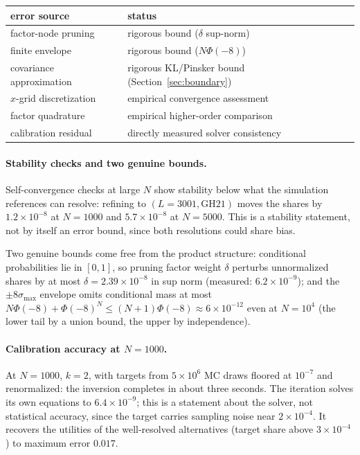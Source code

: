 \documentclass[12pt]{article}
\theoremstyle{remark}
\begin{document}
\begin{center}
\footnotesize
\begin{tabular}{lp{6.2cm}}
\toprule
error source & status \\
\midrule
factor-node pruning & rigorous bound ($\delta$ sup-norm) \\
finite envelope & rigorous bound ($N\Phi(-8)$) \\
covariance approximation & rigorous KL/Pinsker bound (Section~\ref{sec:boundary}) \\
$x$-grid discretization & empirical convergence assessment \\
factor quadrature & empirical higher-order comparison \\
calibration residual & directly measured solver consistency \\
\bottomrule
\end{tabular}
\end{center}

\paragraph{Stability checks and two genuine bounds.} Self-convergence
checks at large $N$ show stability below what the
simulation references can resolve: refining to $(L = 3001, \mathrm{GH}21)$
moves the shares by $1.2\times10^{-8}$ at $N=1000$ and
$5.7\times10^{-8}$ at $N=5000$. This is a stability statement, not by
itself an error bound, since both resolutions could share bias.

Two genuine bounds
come free from the product structure: conditional probabilities lie in
$[0,1]$, so pruning factor weight $\delta$ perturbs unnormalized shares by
at most $\delta = 2.39\times10^{-8}$ in sup norm (measured:
$6.2\times10^{-9}$); and the $\pm8\sigma_{\max}$ envelope omits
conditional mass at most $N\Phi(-8) + \Phi(-8)^N \le (N+1)\Phi(-8)
\approx 6\times10^{-12}$ even at $N = 10^4$ (the lower tail by a union
bound, the upper by independence).

\paragraph{Calibration accuracy at $N=1000$.}

At $N=1000$, $k=2$, with targets from
$5\times10^6$ MC draws floored at $10^{-7}$ and renormalized: the inversion
completes in about three seconds. The iteration solves its own equations to $6.4\times10^{-9}$; this is a
statement about the solver, not statistical accuracy, since the target
carries sampling noise near $2\times10^{-4}$. It recovers the utilities
of the well-resolved alternatives (target share above $3\times10^{-4}$)
to maximum error $0.017$.
\end{document}
